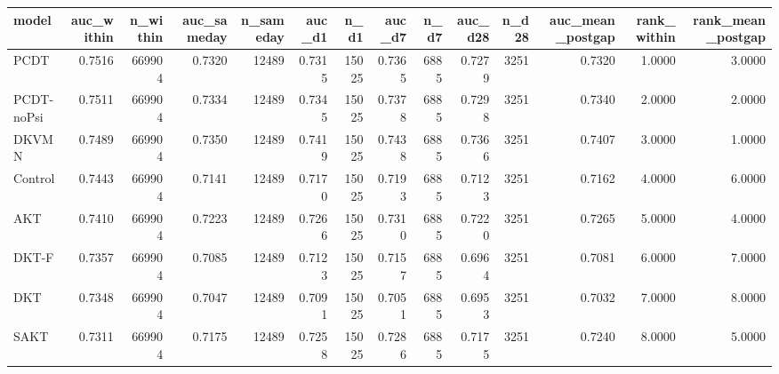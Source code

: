 \begin{tabular}{lrrrrrrrrrrrrr}
\toprule
model & auc\_within & n\_within & auc\_sameday & n\_sameday & auc\_d1 & n\_d1 & auc\_d7 & n\_d7 & auc\_d28 & n\_d28 & auc\_mean\_postgap & rank\_within & rank\_mean\_postgap \\
\midrule
PCDT & 0.7516 & 669904 & 0.7320 & 12489 & 0.7315 & 15025 & 0.7365 & 6885 & 0.7279 & 3251 & 0.7320 & 1.0000 & 3.0000 \\
PCDT-noPsi & 0.7511 & 669904 & 0.7334 & 12489 & 0.7345 & 15025 & 0.7378 & 6885 & 0.7298 & 3251 & 0.7340 & 2.0000 & 2.0000 \\
DKVMN & 0.7489 & 669904 & 0.7350 & 12489 & 0.7419 & 15025 & 0.7438 & 6885 & 0.7366 & 3251 & 0.7407 & 3.0000 & 1.0000 \\
Control & 0.7443 & 669904 & 0.7141 & 12489 & 0.7170 & 15025 & 0.7193 & 6885 & 0.7123 & 3251 & 0.7162 & 4.0000 & 6.0000 \\
AKT & 0.7410 & 669904 & 0.7223 & 12489 & 0.7266 & 15025 & 0.7310 & 6885 & 0.7220 & 3251 & 0.7265 & 5.0000 & 4.0000 \\
DKT-F & 0.7357 & 669904 & 0.7085 & 12489 & 0.7123 & 15025 & 0.7157 & 6885 & 0.6964 & 3251 & 0.7081 & 6.0000 & 7.0000 \\
DKT & 0.7348 & 669904 & 0.7047 & 12489 & 0.7091 & 15025 & 0.7051 & 6885 & 0.6953 & 3251 & 0.7032 & 7.0000 & 8.0000 \\
SAKT & 0.7311 & 669904 & 0.7175 & 12489 & 0.7258 & 15025 & 0.7286 & 6885 & 0.7175 & 3251 & 0.7240 & 8.0000 & 5.0000 \\
\bottomrule
\end{tabular}
